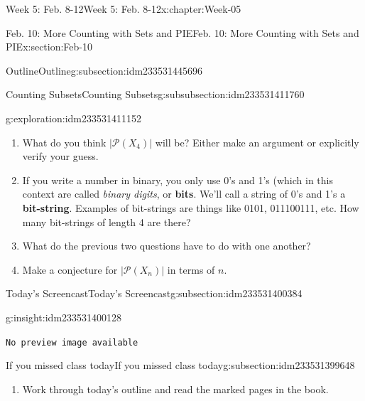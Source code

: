 \documentclass[oneside,10pt,]{book}
\newcommand{\mono}[1]{\texttt{#1}}
\newcommand{\terminology}[1]{\textbf{#1}}
\numberwithin{equation}{section}
\newlength{\qrsize}
\newlength{\previewwidth}
\def\pow{{\mathcal P}}
\newcommand{\pow}{\mathcal P}
\newcommand{\card}[1]{\left| #1 \right|}
\begin{document}
\begin{chapterptx}{Week 5: Feb. 8-12}{}{Week 5: Feb. 8-12}{}{}{x:chapter:Week-05}
\begin{sectionptx}{Feb. 10: More Counting with Sets and PIE}{}{Feb. 10: More Counting with Sets and PIE}{}{}{x:section:Feb-10}
\begin{subsectionptx}{Outline}{}{Outline}{}{}{g:subsection:idm233531445696}
\begin{subsubsectionptx}{Counting Subsets}{}{Counting Subsets}{}{}{g:subsubsection:idm233531411760}
\begin{exploration}{}{g:exploration:idm233531411152}
\begin{enumerate}
\item{}What do you think \(\card{\pow(X_4)}\) will be? Either make an argument or explicitly verify your guess.%
\item{}If you write a number in binary, you only use 0's and 1's (which in this context are called \emph{binary digits}, or \terminology{bits}. We'll call a string of 0's and 1's a \terminology{bit-string}. Examples of bit-strings are things like 0101, 011100111, etc. How many bit-strings of length 4 are there?%
\item{}What do the previous two questions have to do with one another?%
\item{}Make a conjecture for \(\card{\pow(X_n)}\) in terms of \(n\).%
\end{enumerate}
\end{exploration}%
\end{subsubsectionptx}
\end{subsectionptx}
%
%
\typeout{************************************************}
\typeout{************************************************}
%
\begin{subsectionptx}{Today's Screencast}{}{Today's Screencast}{}{}{g:subsection:idm233531400384}
\begin{insight}{}{g:insight:idm233531400128}%
\setlength{\qrsize}{9em}
\setlength{\previewwidth}{\linewidth}
\addtolength{\previewwidth}{-\qrsize}
\begin{tcbraster}[raster columns=2, raster column skip=1pt, raster halign=center, raster force size=false, raster left skip=0pt, raster right skip=0pt]%
\begin{tcolorbox}[previewstyle, width=\previewwidth]%
\mono{No preview image available}%
\end{tcolorbox}%
\begin{tcolorbox}[qrstyle]%
[QR LINK]\end{tcolorbox}%
\end{tcbraster}%
\end{insight}
\end{subsectionptx}
%
%
\typeout{************************************************}
\typeout{************************************************}
%
\begin{subsectionptx}{If you missed class today}{}{If you missed class today}{}{}{g:subsection:idm233531399648}
%
\begin{enumerate}
\item{}Work through today's outline and read the marked pages in the book.%

\end{enumerate}
\end{subsectionptx}
\end{sectionptx}
\end{chapterptx}
\end{document}
